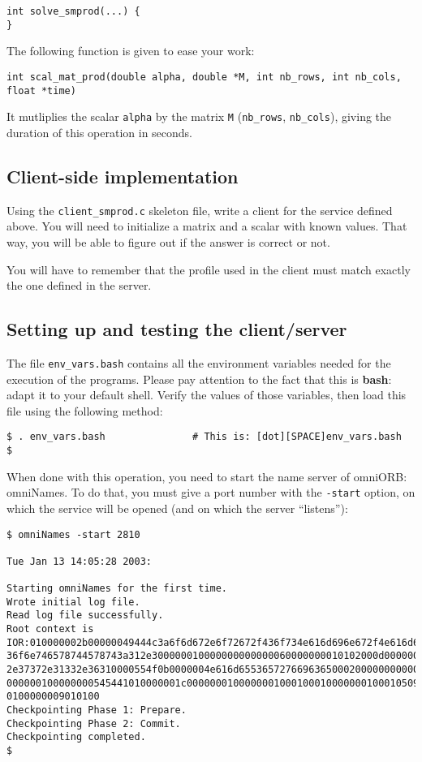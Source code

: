 \documentclass[11pt,a4paper]{article}
\begin{document}
\footnotesize
\begin{verbatim}
int solve_smprod(...) {
}
\end{verbatim}
\normalsize
\noindent
The following function is given to ease your work:
\footnotesize
\begin{verbatim}
int scal_mat_prod(double alpha, double *M, int nb_rows, int nb_cols, float *time)
\end{verbatim}
\normalsize
\noindent
It mutliplies the scalar \texttt{alpha} by the matrix \texttt{M}
(\texttt{nb\_rows}, \texttt{nb\_cols}), giving the duration of this operation in 
seconds.


\subsection{Client-side implementation}

Using the \texttt{client\_smprod.c} skeleton file, write a client for the service
defined above. You will need to initialize a matrix and a scalar with known
values. That way, you will be able to figure out if the answer is correct or
not. \par

You will have to remember that the profile used in the client must match 
exactly the one defined in the server.

\subsection{Setting up and testing the client/server}

The file \texttt{env\_vars.bash} contains all the environment variables needed
for the execution of the programs. Please pay attention to the fact that this is
\textbf{bash}: adapt it to your default shell. Verify the values of those
variables, then load this file using the following method:

\footnotesize
\begin{verbatim}
$ . env_vars.bash               # This is: [dot][SPACE]env_vars.bash
$
\end{verbatim}
\normalsize

When done with this operation, you need to start the name server of omniORB:
omniNames. To do that, you must give a port number with the \texttt{-start}
option, on which the service will be opened (and on which the server
``listens''):
\footnotesize
\begin{verbatim}
$ omniNames -start 2810

Tue Jan 13 14:05:28 2003:

Starting omniNames for the first time.
Wrote initial log file.
Read log file successfully.
Root context is
IOR:010000002b00000049444c3a6f6d672e6f72672f436f734e616d696e672f4e616d696e674
36f6e746578744578743a312e300000010000000000000060000000010102000d000000313430
2e37372e31332e36310000554f0b0000004e616d6553657276696365000200000000000000080
000000100000000545441010000001c0000000100000001000100010000000100010509010100
0100000009010100
Checkpointing Phase 1: Prepare.
Checkpointing Phase 2: Commit.
Checkpointing completed.
$
\end{verbatim}
\normalsize
\end{document}
